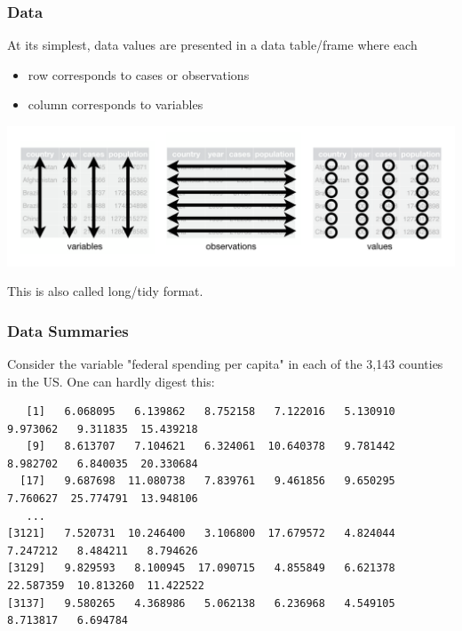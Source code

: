 \documentclass[slides]{beamer}
\newcommand{\blue}[1]{\textcolor{blue2}{#1}}
\begin{document}
\begin{frame}
\frametitle{Data}

At its simplest, data values are presented in a data table/frame where each
\begin{itemize}
\pause\item row corresponds to \blue{cases} or \blue{observations}
\pause\item column corresponds to \blue{variables}
\end{itemize}

\begin{center}
\pause\includegraphics[width=\linewidth]{figure/tidy} 
\end{center}

\pause This is also called \blue{long/tidy} format. 
\end{frame}




\begin{frame}[fragile]
\frametitle{Data Summaries}

Consider the variable "federal spending per capita" in each of the 3,143 counties in the US.  One can hardly digest this:

\begin{tiny}
\begin{verbatim}
   [1]   6.068095   6.139862   8.752158   7.122016   5.130910   9.973062   9.311835  15.439218
   [9]   8.613707   7.104621   6.324061  10.640378   9.781442   8.982702   6.840035  20.330684
  [17]   9.687698  11.080738   7.839761   9.461856   9.650295   7.760627  25.774791  13.948106
   ...
[3121]   7.520731  10.246400   3.106800  17.679572   4.824044   7.247212   8.484211   8.794626
[3129]   9.829593   8.100945  17.090715   4.855849   6.621378  22.587359  10.813260  11.422522
[3137]   9.580265   4.368986   5.062138   6.236968   4.549105   8.713817   6.694784
\end{verbatim}
\end{tiny}

\end{frame}
\end{document}
